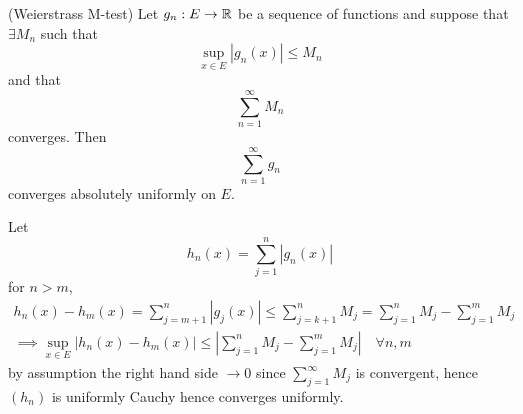 \documentclass{article}
\begin{document}
\begin{theorem}
	(Weierstrass M-test) Let  $ g_n:E\to\mathbb{R} $ be a sequence of functions and suppose that $ \exists M_n $ such that
	\[
		\sup_{x\in E}|g_n(x)|\le M_n
	\]
	and that
	\[
		\sum_{n=1}^\infty M_n
	\]
	converges. Then
	\[
		\sum_{n=1}^\infty g_n
	\]
	converges absolutely uniformly on $ E $.
\end{theorem}
\pf Let
\[
	h_n(x)=\sum_{j=1}^n |g_n(x)|
\]
for $ n>m $,
\begin{align*}
	h_n(x)-h_m(x)=\sum_{j=m+1}^n|g_j(x)|\le \sum_{j=k+1}^nM_j=\sum_{j=1}^nM_j -\sum_{j=1}^m M_j\\
	\implies \sup_{x\in E}|h_n(x)-h_m(x)|\le \left|\sum_{j=1}^n M_j-\sum_{j=1}^m M_j\right|\quad\forall n,m
\end{align*}
by assumption the right hand side $ \to 0 $ since $ \sum_{j=1}^\infty M_j $ is convergent, hence $ (h_n) $ is uniformly Cauchy hence converges uniformly.
\end{document}

